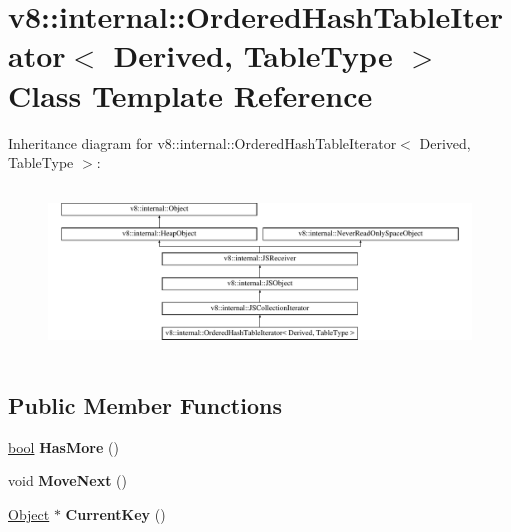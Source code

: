 \hypertarget{classv8_1_1internal_1_1OrderedHashTableIterator}{}\section{v8\+:\+:internal\+:\+:Ordered\+Hash\+Table\+Iterator$<$ Derived, Table\+Type $>$ Class Template Reference}
\label{classv8_1_1internal_1_1OrderedHashTableIterator}
Inheritance diagram for v8\+:\+:internal\+:\+:Ordered\+Hash\+Table\+Iterator$<$ Derived, Table\+Type $>$\+:\begin{figure}[H]
\begin{center}
\leavevmode
\includegraphics[height=4.504022cm]{classv8_1_1internal_1_1OrderedHashTableIterator}
\end{center}
\end{figure}
\subsection*{Public Member Functions}
\begin{DoxyCompactItemize}
\item 
\mbox{\label{classv8_1_1internal_1_1OrderedHashTableIterator_aa94b8047912a336e730ada258013dbe8}} 
\mbox{\hyperlink{classbool}{bool}} {\bfseries Has\+More} ()
\item 
\mbox{\label{classv8_1_1internal_1_1OrderedHashTableIterator_a3306e47a6a632a107e1f7fa5d31df4f3}} 
void {\bfseries Move\+Next} ()
\item 
\mbox{\label{classv8_1_1internal_1_1OrderedHashTableIterator_a9a6ff903ec62a451f0f3e4c0220b3548}} 
\mbox{\hyperlink{classv8_1_1internal_1_1Object}{Object}} $\ast$ {\bfseries Current\+Key} ()
\end{DoxyCompactItemize}
